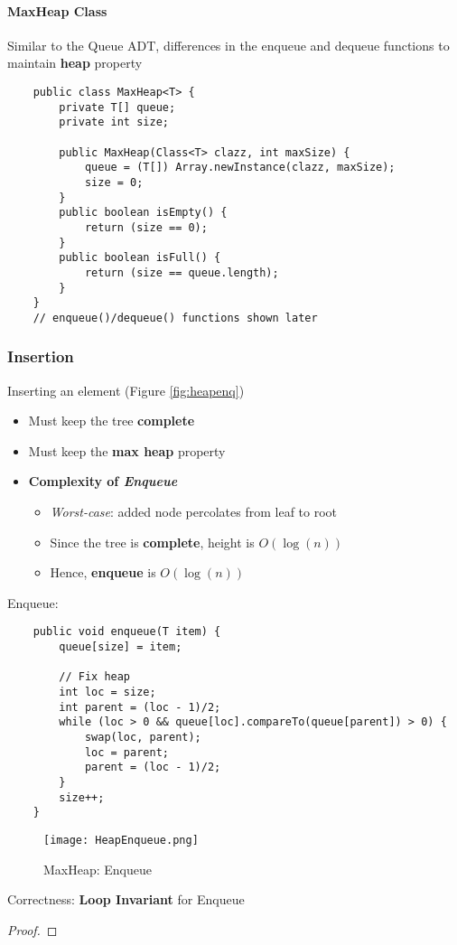 \documentclass[10pt, 
a4paper, 
oneside, 
headinclude, footinclude, 
BCOR5mm]
{scrartcl}
\begin{document}
\paragraph{\textbf{MaxHeap Class}}
Similar to the Queue ADT, differences in the enqueue and dequeue functions to maintain \textbf{heap} property
\begin{lstlisting}
    public class MaxHeap<T> {
        private T[] queue;
        private int size;

        public MaxHeap(Class<T> clazz, int maxSize) {
            queue = (T[]) Array.newInstance(clazz, maxSize);
            size = 0;
        }
        public boolean isEmpty() {
            return (size == 0);
        }
        public boolean isFull() {
            return (size == queue.length);
        }
    }
    // enqueue()/dequeue() functions shown later
\end{lstlisting}
\subsubsection{Insertion}
\begin{definition}
    Inserting an element (Figure \vref{fig:heapenq})
    \begin{itemize}
        \item Must keep the tree \textbf{complete}
        \item Must keep the \textbf{max heap} property
        \item \textbf{Complexity of \textit{Enqueue}}
        \begin{itemize}
            \item \textit{Worst-case}: added node percolates from leaf to root
            \item Since the tree is \textbf{complete}, height is $O(\log(n))$
            \item Hence, \textbf{enqueue} is $O(\log(n))$
        \end{itemize}
    \end{itemize}
\end{definition}
Enqueue:
\begin{lstlisting}
    public void enqueue(T item) {
        queue[size] = item;

        // Fix heap
        int loc = size;
        int parent = (loc - 1)/2;
        while (loc > 0 && queue[loc].compareTo(queue[parent]) > 0) {
            swap(loc, parent);
            loc = parent;
            parent = (loc - 1)/2;
        }
        size++;
    }
\end{lstlisting}
\begin{figure}[H]
    \begin{center}
        \texttt{[image: HeapEnqueue.png]}
        \caption{MaxHeap: Enqueue}
        \label{fig:heapenq}
    \end{center}
\end{figure}
Correctness: \textbf{Loop Invariant} for Enqueue
\begin{proof}
        
\end{proof}
\newpage
\end{document}

